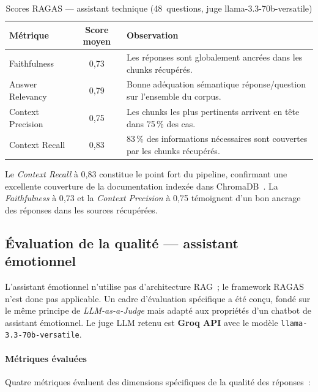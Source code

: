 \vspace{6pt}
\begin{table}[H]
\centering
\caption{Scores RAGAS — assistant technique (48~questions, juge llama-3.3-70b-versatile)}
\label{tab:ragas_results}
\begin{tabular}{|l|c|p{6cm}|}
\hline
\textbf{Métrique} & \textbf{Score moyen} & \textbf{Observation} \\
\hline
Faithfulness        & 0{,}73 & Les réponses sont globalement ancrées dans les chunks récupérés. \\
\hline
Answer Relevancy    & 0{,}79 & Bonne adéquation sémantique réponse/question sur l'ensemble du corpus. \\
\hline
Context Precision   & 0{,}75 & Les chunks les plus pertinents arrivent en tête dans 75\,\% des cas. \\
\hline
Context Recall      & 0{,}83 & 83\,\% des informations nécessaires sont couvertes par les chunks récupérés. \\
\hline
\end{tabular}
\end{table}

Le \emph{Context Recall} à 0,83 constitue le point fort du pipeline,
confirmant une excellente couverture de la documentation indexée dans ChromaDB~\cite{chromadb}.
La \emph{Faithfulness} à 0,73 et la \emph{Context Precision} à 0,75 témoignent
d'un bon ancrage des réponses dans les sources récupérées.

\subsection{Évaluation de la qualité — assistant émotionnel}
\label{subsec:eval_emotional}

L'assistant émotionnel n'utilise pas d'architecture RAG~;
le framework RAGAS n'est donc pas applicable.
Un cadre d'évaluation spécifique a été conçu, fondé sur le même principe
de \emph{LLM-as-a-Judge} mais adapté aux propriétés d'un chatbot de assistant émotionnel.
Le juge LLM retenu est \textbf{Groq API} avec le modèle \texttt{llama-3.3-70b-versatile}.

\paragraph{Métriques évaluées}\mbox{}\newline

Quatre métriques évaluent des dimensions spécifiques de la qualité des réponses~:


